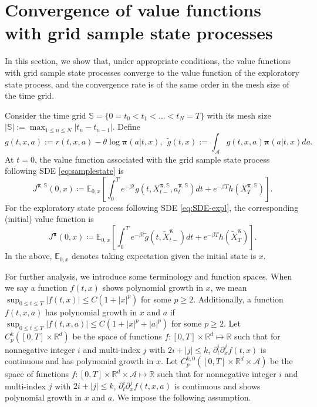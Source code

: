 \documentclass[11pt]{article}
\newcommand{\1}{\mathbbm{1}}
\newcommand{\bpi}{\boldsymbol{\pi}}
\begin{document}


\section{Convergence of value functions with grid sample state processes}
In this section, we show that, under appropriate conditions, the value functions with grid sample state processes converge to the value function of the exploratory state process, and the convergence rate is of the same order in the mesh size of the time grid.

Consider the time grid $\mathbb{S}= \{0 = t_0 < t_1 < \ldots < t_N = T\}$ with its mesh size $|\mathbb{S}|:=\max_{1\leq n\leq N}|t_{n}-t_{n-1}|$. Define
\begin{equation}
	g(t,x,a):=r(t,x,a) - \theta\log\bpi(a|t,x),\ \ \tilde{g}(t,x):=\int_{\mathcal{A}}g(t,x,a)\bpi(a|t,x)da.
\end{equation}
At $t=0$, the value function associated with  the grid sample state process following SDE \eqref{eq:samplestate} is
\begin{equation}
J^{\bpi,\mathbb{S}}(0,x) \coloneqq \mathbb{E}_{0,x}\left[  \int_0^T  e^{-\beta t} g(t, X_{t-}^{\bpi, \mathbb{S}}, a_{t}^{\bpi, \mathbb{S}}) dt +  e^{-\beta T } h(X_T^{\bpi, \mathbb{S}} )\right].
\end{equation}
For the exploratory state process following SDE \eqref{eq:SDE-expl}, the corresponding (initial) value function is
\begin{equation}
	J^{\bpi}(0,x) \coloneqq \mathbb{E}_{0,x}\left[  \int_0^T  e^{-\beta t} \tilde{g}(t, \tilde{X}_{t-}^{\bpi})dt +  e^{-\beta T } h( \tilde X_T^{\bpi} )\right].
\end{equation}
In the above, $\mathbb{E}_{0,x}$ denotes taking expectation given the initial state is $x$.

For further analysis, we introduce some terminology and function spaces. When we say a function $f(t,x)$ shows polynomial growth in $x$, we mean $\sup_{0\leq t\leq T}|f(t,x)|\leq C(1+|x|^p)$ for some $p\geq 2$. Additionally, a function $f(t,x,a)$ has polynomial growth in $x$ and $a$ if $\sup_{0\leq t\leq T}|f(t,x,a)|\leq C(1+|x|^p+|a|^p)$ for some $p\geq 2$. Let $C^{k}_{p}([0,T]\times\mathbb{R}^d)$ be the space of functions $f: [0,T]\times\mathbb{R}^d\mapsto \mathbb{R}$ such that for nonnegative integer $i$ and multi-index $j$ with $2i+|j|\leq k$, $\partial_t^i\partial_x^j f(t,x)$ is continuous and has polynomial growth in $x$. Let $C^{k,0}_p([0,T]\times\mathbb{R}^d\times\mathcal{A})$ be the space of functions $f: [0,T]\times\mathbb{R}^d\times\mathcal{A}\mapsto \mathbb{R}$ such that for nonnegative integer $i$ and multi-index $j$ with $2i+|j|\leq k$, $\partial_t^i\partial_x^j f(t,x,a)$ is continuous and shows polynomial growth in $x$ and $a$. We impose the following assumption.
\end{document}
